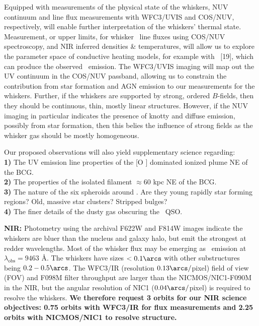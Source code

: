\documentclass[12pt]{article}
\begin{document}
Equipped with measurements of the physical state of the whiskers, NUV
continuum and line flux measurements with WFC3/UVIS and COS/NUV,
respectively, will enable further interpretation of the whiskers'
thermal state. Measurement, or upper limits, for whisker \civ\ line
fluxes using COS/NUV spectroscopy, and NIR inferred densities \&
temperatures, will allow us to explore the parameter space of
conductive heating models, for example with \cloudy\ [19], which can
produce the observed \civ\ emission. The WFC3/UVIS imaging will map
out the UV continuum in the COS/NUV passband, allowing us to constrain
the contribution from star formation and AGN emission to our
measurements for the whiskers. Further, if the whiskers are supported
by strong, ordered $B$-fields, then they should be continuous, thin,
mostly linear structures. However, if the NUV imaging in particular
indicates the presence of knotty and diffuse emission, possibly from
star formation, then this belies the influence of strong fields as the
whisker gas should be mostly homogeneous.

Our proposed observations will also yield supplementary science
regarding:\\
{\bf{1)}} The UV emission line properties of the [O ]
dominated ionized plume NE of the BCG.\\
{\bf{2)}} The properties of the isolated filament $\approx 60$ kpc NE
of the BCG.\\
{\bf{3)}} The nature of the six spheroids around \irs. Are they young
rapidly star forming regions? Old, massive star clusters? Stripped
bulges?\\
{\bf{4)}} The finer details of the dusty gas obscuring the
\irs\ QSO.

\describeobservations

{\bf{NIR:}} Photometry using the archival F622W and F814W images
indicate the whiskers are bluer than the nucleus and galaxy halo, but
emit the strongest at redder wavelengths. Most of the whisker flux may
be emerging as \halpha\ emission at $\lambda_{\mathrm{obs}} = 9463$
\AA. The whiskers have sizes $< 0.1\arcs$ with other substructures
being $0.2-0.5\arcs$. The WFC3/IR (resolution $0.13\arcs/$pixel) field
of view (FOV) and F098M filter throughput are larger than the
NICMOS/NIC1-F090M in the NIR, but the angular resolution of NIC1
($0.04\arcs/$pixel) is required to resolve the whiskers. {\bf{We
    therefore request 3 orbits for our NIR science objectives: 0.75
    orbits with WFC3/IR for flux measurements and 2.25 orbits with
    NICMOS/NIC1 to resolve structure.}}
\end{document}
